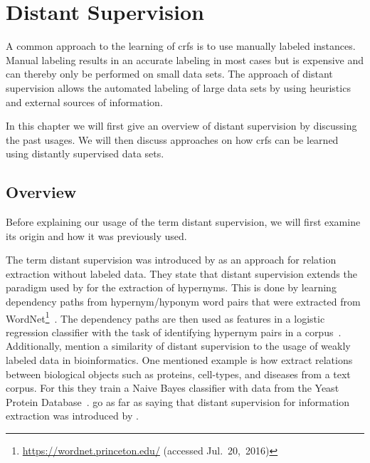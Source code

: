 \chapter{Distant Supervision}\label{cha:distant-supervision}

A common approach to the learning of \glspl{crf} is to use manually labeled instances.
Manual labeling results in an accurate labeling in most cases but is expensive and can thereby only be performed on small data sets.
The approach of \gls{distant supervision} allows the automated labeling of large data sets by using heuristics and external sources of information.

In this chapter we will first give an overview of \gls{distant supervision} by discussing the past usages.
We will then discuss approaches on how \glspl{crf} can be learned using distantly supervised data sets.

\section{Overview}

Before explaining our usage of the term \gls{distant supervision}, we will first examine its origin and how it was previously used.

\bigskip

The term \gls{distant supervision} was introduced by \citet{mintz2009distant} as an approach for relation extraction without labeled data.
They state that \gls{distant supervision} extends the paradigm used by \citet{snow2005learning} for the extraction of hypernyms.
This is done by learning dependency paths from hypernym/hyponym word pairs that were extracted from WordNet\footnote{\url{https://wordnet.princeton.edu/} (accessed Jul.~20,~2016)}~\citep{snow2005learning}.
The dependency paths are then used as features in a logistic regression classifier with the task of identifying hypernym pairs in a corpus~\citep{snow2005learning}.
Additionally, \citet{mintz2009distant} mention a similarity of \gls{distant supervision} to the usage of weakly labeled data in bioinformatics.
One mentioned example is how \citet{craven1999constructing} extract relations between biological objects such as proteins, cell-types, and diseases from a text corpus.
For this they train a Naive Bayes classifier with data from the Yeast Protein Database~\citep{payne1997yeast}.
\citet{surdeanu2012multi} go as far as saying that distant supervision for information extraction was introduced by \citet{craven1999constructing}.


